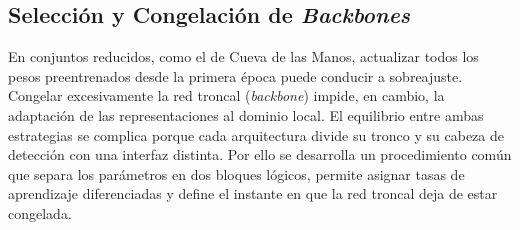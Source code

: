 \subsection{Selección y Congelación de \emph{Backbones}}\label{ssec:freeze}

En conjuntos reducidos, como el de Cueva de las Manos, actualizar todos los pesos preentrenados desde la primera época puede conducir a sobreajuste.
Congelar excesivamente la red troncal (\emph{backbone}) impide, en cambio, la adaptación de las representaciones al dominio local.
El equilibrio entre ambas estrategias se complica porque cada arquitectura divide su tronco y su cabeza de detección con una interfaz distinta.
Por ello se desarrolla un procedimiento común que separa los parámetros en dos bloques lógicos, permite asignar tasas de aprendizaje diferenciadas y define el instante en que la red troncal deja de estar congelada.

